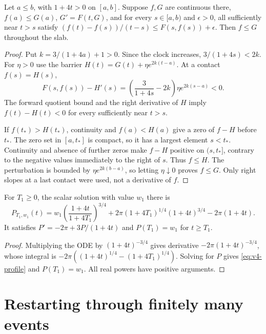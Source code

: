 \begin{proposition}
\label{prop:v4-m81}
Let $a\leq b$, with $1+4t>0$ on $[a,b]$. Suppose $f,G$ are
continuous there, $f(a)\leq G(a)$, $G'=F(t,G)$, and for every
$s\in[a,b)$ and $\epsilon>0$, all sufficiently near $t>s$ satisfy
$(f(t)-f(s))/(t-s)\leq F(s,f(s))+\epsilon$.
Then $f\leq G$ throughout the slab.
\end{proposition}
\begin{proof}
Put $k=3/(1+4a)+1>0$. Since the clock increases,
$3/(1+4s)<2k$. For $\eta>0$ use the barrier
$H(t)=G(t)+\eta e^{2k(t-a)}$. At a contact $f(s)=H(s)$,
\[
 F(s,f(s))-H'(s)
 =\left(\frac3{1+4s}-2k\right)\eta e^{2k(s-a)}<0.
\]
The forward quotient bound and the right derivative of $H$ imply
$f(t)-H(t)<0$ for every sufficiently near $t>s$.

If $f(t_*)>H(t_*)$, continuity and $f(a)<H(a)$ give a zero of $f-H$
before $t_*$. The zero set in $[a,t_*]$ is compact, so it has a largest
element $s<t_*$. Continuity and absence of further zeros make $f-H$
positive on $(s,t_*]$, contrary to the negative values immediately to
the right of $s$. Thus $f\leq H$. The perturbation is bounded by
$\eta e^{2k(b-a)}$, so letting $\eta\downarrow0$ proves $f\leq G$.
Only right slopes at a last contact were used, not a derivative of $f$.
\end{proof}

\begin{lemma}
\label{lem:v4-profile}
For $T_1\geq0$, the scalar solution with value $w_1$ there is
\begin{equation}
 P_{T_1,w_1}(t)=
 w_1\left(\frac{1+4t}{1+4T_1}\right)^{3/4}
 +2\pi(1+4T_1)^{1/4}(1+4t)^{3/4}-2\pi(1+4t).
 \label{eq:v4-profile}
\end{equation}
It satisfies $P'= -2\pi+3P/(1+4t)$ and $P(T_1)=w_1$ for $t\geq T_1$.
\end{lemma}
\begin{proof}
Multiplying the ODE by $(1+4t)^{-3/4}$ gives derivative
$-2\pi(1+4t)^{-3/4}$, whose integral is
$-2\pi((1+4t)^{1/4}-(1+4T_1)^{1/4})$. Solving for $P$ gives
\eqref{eq:v4-profile} and $P(T_1)=w_1$. All real powers have positive
arguments.
\end{proof}

\section{Restarting through finitely many events}


